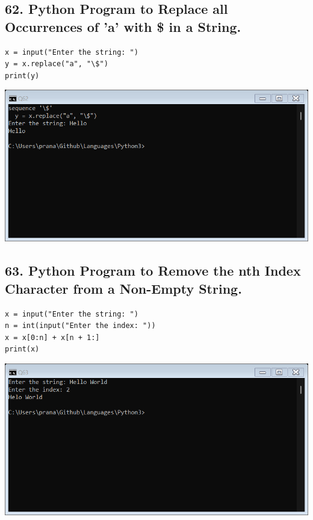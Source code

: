 \documentclass[12pt]{article}
\begin{document}
\subsection*{62. Python Program to Replace all Occurrences of 'a' with \$ in a String.}
\begin{verbatim}
x = input("Enter the string: ")
y = x.replace("a", "\$")
print(y)
\end{verbatim}
\includegraphics[width=\linewidth]{images/62.png}

\subsection*{63. Python Program to Remove the nth Index Character from a Non-Empty String.}
\begin{verbatim}
x = input("Enter the string: ")
n = int(input("Enter the index: "))
x = x[0:n] + x[n + 1:]
print(x)
\end{verbatim}
\includegraphics[width=\linewidth]{images/63.png}
\end{document}
